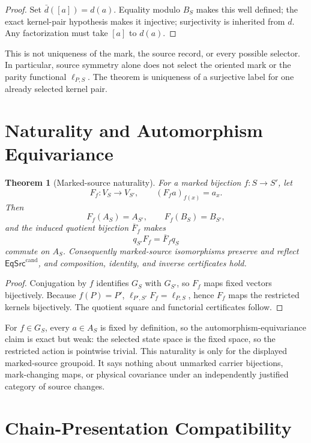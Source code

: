 \documentclass[11pt]{article}
\newtheorem{theorem}{Theorem}
\newcommand{\EqCand}{\mathsf{EqSrc}^{\mathrm{cand}}}
\begin{document}
\begin{proof}
Set \(\bar d([a])=d(a)\). Equality modulo \(B_S\) makes this well defined;
the exact kernel-pair hypothesis makes it injective; surjectivity is inherited
from \(d\). Any factorization must take \([a]\) to \(d(a)\).
\end{proof}

This is not uniqueness of the mark, the source record, or every possible
selector. In particular, source symmetry alone does not select the oriented
mark or the parity functional \(\ell_{P,S}\). The theorem is uniqueness of a
surjective label for one already selected kernel pair.

\section{Naturality and Automorphism Equivariance}

\begin{theorem}[Marked-source naturality]
For a marked bijection \(f:S\to S'\), let
\[
 F_f:V_S\longrightarrow V_{S'},\qquad
 (F_fa)_{f(x)}=a_x.
\]
Then
\[
 F_f(A_S)=A_{S'},\qquad F_f(B_S)=B_{S'},
\]
and the induced quotient bijection \(\overline F_f\) makes
\[
 \boxed{\quad q_{S'}F_f=\overline F_fq_S\quad}
\]
commute on \(A_S\). Consequently marked-source isomorphisms preserve and
reflect \(\EqCand\), and composition, identity, and inverse certificates hold.
\end{theorem}

\begin{proof}
Conjugation by \(f\) identifies \(G_S\) with \(G_{S'}\), so \(F_f\) maps
fixed vectors bijectively. Because \(f(P)=P'\),
\(\ell_{P',S'}F_f=\ell_{P,S}\), hence \(F_f\) maps the restricted kernels
bijectively. The quotient square and functorial certificates follow.
\end{proof}

For \(f\in G_S\), every \(a\in A_S\) is fixed by definition, so the
automorphism-equivariance claim is exact but weak: the selected state space
is the fixed space, so the restricted action is pointwise trivial. This
naturality is only for the displayed marked-source groupoid. It says nothing
about unmarked carrier bijections, mark-changing maps, or physical covariance
under an independently justified category of source changes.

\section{Chain-Presentation Compatibility}
\end{document}
